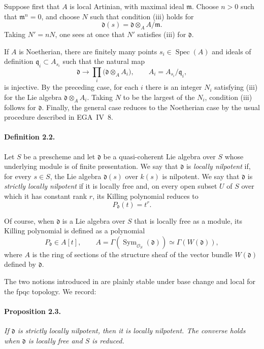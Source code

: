 Suppose first that \(A\) is local Artinian, with maximal ideal
\(\mathfrak m\). Choose \(n>0\) such that \(\mathfrak m^n=0\), and
choose \(N\) such that condition \textup{(iii)} holds for
\[
  \mathfrak d(s)=\mathfrak d\otimes_A A/\mathfrak m.
\]
Taking \(N'=nN\), one sees at once that \(N'\) satisfies
\textup{(iii)} for \(\mathfrak d\).

If \(A\) is Noetherian, there are finitely many points
\(s_i\in\operatorname{Spec}(A)\) and ideals of definition
\(\mathfrak q_i\subset A_{s_i}\) such that the natural map
\[
  \mathfrak d\longrightarrow
  \prod_i\bigl(\mathfrak d\otimes_A A_i\bigr),
  \qquad A_i=A_{s_i}/\mathfrak q_i,
\]
is injective. By the preceding case, for each \(i\) there is an
integer \(N_i\) satisfying \textup{(iii)} for the Lie algebra
\(\mathfrak d\otimes_A A_i\). Taking \(N\) to be the largest of the
\(N_i\), condition \textup{(iii)} follows for \(\mathfrak d\).
Finally, the general case reduces to the Noetherian case by the
usual procedure described in EGA~IV~8.

\paragraph{\textbf{Definition 2.2.}}
Let \(S\) be a prescheme and let \(\mathfrak d\) be a
quasi-coherent Lie algebra over \(S\) whose underlying module is of
finite presentation. We say that \(\mathfrak d\) is
\emph{locally nilpotent} if, for every \(s\in S\), the Lie algebra
\(\mathfrak d(s)\) over \(k(s)\) is nilpotent. We say that
\(\mathfrak d\) is \emph{strictly locally nilpotent} if it is
locally free and, on every open subset \(U\) of \(S\) over which it
has constant rank \(r\), its Killing polynomial reduces to
\[
  P_{\mathfrak d}(t)=t^r.
\]

Of course, when \(\mathfrak d\) is a Lie algebra over \(S\) that is
locally free as a module, its Killing polynomial is defined as a
polynomial
\[
  P_{\mathfrak d}\in A[t],
  \qquad
  A=\Gamma\!\left(\operatorname{Sym}_{\mathcal O_S}(\mathfrak d)\right)
   \simeq \Gamma\!\left(W(\mathfrak d)\right),
\]
where \(A\) is the ring of sections of the structure sheaf of the
vector bundle \(W(\mathfrak d)\) defined by \(\mathfrak d\).

The two notions introduced in  are plainly stable under base
change and local for the fpqc topology. We record:

\paragraph{\textbf{Proposition 2.3.}}
\emph{If \(\mathfrak d\) is strictly locally nilpotent, then it is
locally nilpotent. The converse holds when \(\mathfrak d\) is
locally free and \(S\) is reduced.}

